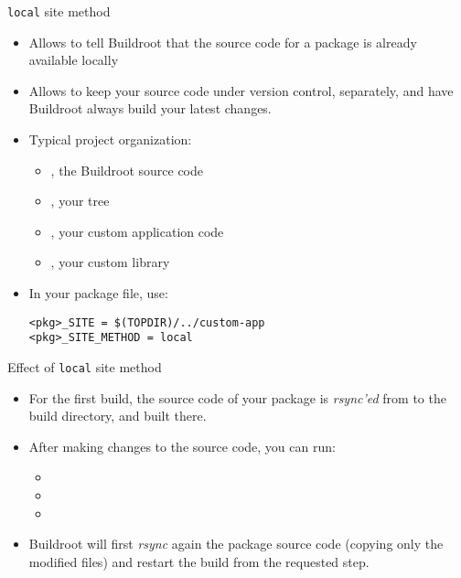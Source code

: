 \begin{frame}[fragile]{{\tt local} site method}
  \begin{itemize}
  \item Allows to tell Buildroot that the source code for a package is
    already available locally
  \item Allows to keep your source code under version control,
    separately, and have Buildroot always build your latest changes.
  \item Typical project organization:
    \begin{itemize}
    \item {}, the Buildroot source code
    \item {}, your  tree
    \item {}, your custom application code
    \item {}, your custom library
    \end{itemize}
  \item In your package  file, use:
    \begin{block}{}
\begin{verbatim}
<pkg>_SITE = $(TOPDIR)/../custom-app
<pkg>_SITE_METHOD = local
\end{verbatim}
    \end{block}
  \end{itemize}
\end{frame}

\begin{frame}{Effect of {\tt local} site method}
  \begin{itemize}
  \item For the first build, the source code of your package is {\em
      rsync'ed} from  to the build directory, and
    built there.
  \item After making changes to the source code, you can run:
    \begin{itemize}
    \item {}
    \item {}
    \item {}
    \end{itemize}
  \item Buildroot will first {\em rsync} again the package source code
    (copying only the modified files) and restart the build from the
    requested step.
  \end{itemize}
\end{frame}

